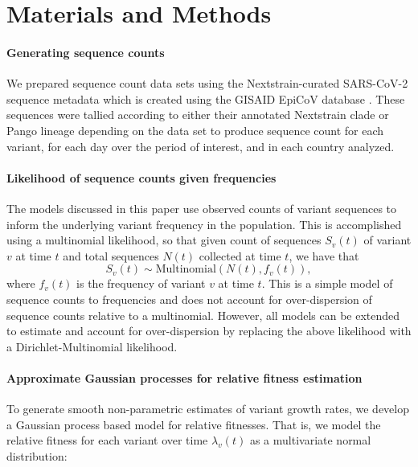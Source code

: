 \documentclass[11pt,oneside,letterpaper]{article}
\begin{document}
\section*{Materials and Methods}

\paragraph{Generating sequence counts}

We prepared sequence count data sets using the Nextstrain-curated SARS-CoV-2 sequence metadata \cite{Hadfield2018} which is created using the GISAID EpiCoV database \cite{khare2021gisaid}.
These sequences were tallied according to either their annotated Nextstrain clade or Pango lineage \cite{aksamentov2021nextclade} depending on the data set to produce sequence count for each variant, for each day over the period of interest, and in each country analyzed.

\paragraph{Likelihood of sequence counts given frequencies}

The models discussed in this paper use observed counts of variant sequences to inform the underlying variant frequency in the population.
This is accomplished using a multinomial likelihood, so that given count of sequences $S_{v}(t)$ of variant $v$ at time $t$ and total sequences $N(t)$ collected at time $t$, we have that
\begin{equation}
    S_{v}(t) \sim \text{Multinomial}(N(t), f_{v}(t)),
\end{equation}
where $f_{v}(t)$ is the frequency of variant $v$ at time $t$.
This is a simple model of sequence counts to frequencies and does not account for over-dispersion of sequence counts relative to a multinomial.
However, all models can be extended to estimate and account for over-dispersion by replacing the above likelihood with a Dirichlet-Multinomial likelihood.

\paragraph{Approximate Gaussian processes for relative fitness estimation}

To generate smooth non-parametric estimates of variant growth rates, we develop a Gaussian process based model for relative fitnesses.
That is, we model the relative fitness for each variant over time $\lambda_v(t)$ as a multivariate normal distribution:
\end{document}
